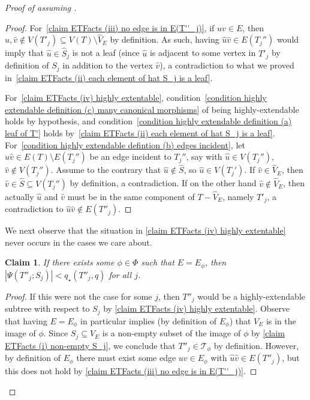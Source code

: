 \documentclass[12pt,letterpaper]{article}
\newtheorem{claim}[theorem]{Claim}
\theoremstyle{definition}
\newcommand{\Pow}{{q_\star}} %
\renewcommand{\c}[1]{\mathcal{#1}}
\newcommand{\sm}{\setminus}
\newcommand{\sub}{\subseteq}
\begin{document}
\begin{proof}[Proof of  assuming ]
\begin{proof}
			
			
			For~\ref{claim ETFacts (iii) no edge is in E(T''_j)}, if $uv\in E$, then $\hat{u},\hat{v}\not\in V(T'_j)\sub V(T)\sm \widehat{V}_E$ by definition.  As such, having $\hat{u}\hat{v}\in E(T_j'')$ would imply that $\hat{u}\in \widehat{S}_j$ is not a leaf (since $\hat{u}$ is adjacent to some vertex in $T'_j$ by definition of $S_j$ in addition to the vertex $\hat{v}$), a contradiction to what we proved in~\ref{claim ETFacts (ii) each element of hat S_j is a leaf}.
			
			For~\ref{claim ETFacts (iv) highly extentable}, condition~\ref{condition highly extendable definition (c) many canonical morphisms} of being highly-extendable holds by hypothesis, and condition~\ref{condition highly extendable definition (a) leaf of T'} holds by~\ref{claim ETFacts (ii) each element of hat S_j is a leaf}. For~\ref{condition highly extendable defintion (b) edges incident}, let $\hat{u}\hat{v}\in E(T)\setminus E(T_j'')$ be an edge incident to $T_j''$, say with $\hat{u}\in V(T_j'')$, $\hat{v}\not\in V(T_j'')$. Assume to the contrary that $\hat{u}\not\in \widehat{S}$, so $\hat{u}\in V(T_j')$. If $\hat{v}\in \widehat{V}_E$, then $\hat{v}\in \widehat{S}\subseteq V(T_j'')$ by definition, a contradiction. If on the other hand $\hat{v}\not\in \widehat{V}_E$, then actually $\hat{u}$ and $\hat{v}$ must be in the same component of $T-\widehat{V}_E$, namely $T'_j$, a contradiction to $\hat{u}\hat{v}\notin E(T''_j)$.
		\end{proof}
		We next observe that the situation in \ref{claim ETFacts (iv) highly extentable} never occurs in the cases we care about.
		
		
		
		\begin{claim}\label{cl:ETSmall}
			If there exists some $\phi\in \Phi$ such that $E=E_\phi$, then $|\Psi(T''_j;S_j)|<\Pow(T''_j,q)$ for all $j$.
		\end{claim}
		
		\begin{proof}
			If this were not the case for some $j$, then $T''_j$ would be a highly-extendable subtree with respect to $S_j$ by \ref{claim ETFacts (iv) highly extentable}.  Observe that having $E=E_\phi$ in particular implies (by definition of $E_\phi$) that $V_E$ is in the image of $\phi$. Since $S_j\sub V_E$ is a non-empty subset of the image of $\phi$ by \ref{claim ETFacts (i) non-empty S_j}, we conclude that $T''_j\in\c{T}_\phi$ by definition.  However, by definition of $E_\phi$ there must exist some edge $uv\in E_\phi$ with $\hat{u}\hat{v}\in E(T''_j)$, but this does not hold by \ref{claim ETFacts (iii) no edge is in E(T''_j)}.
			

\end{proof}
\end{proof}
\end{document}
